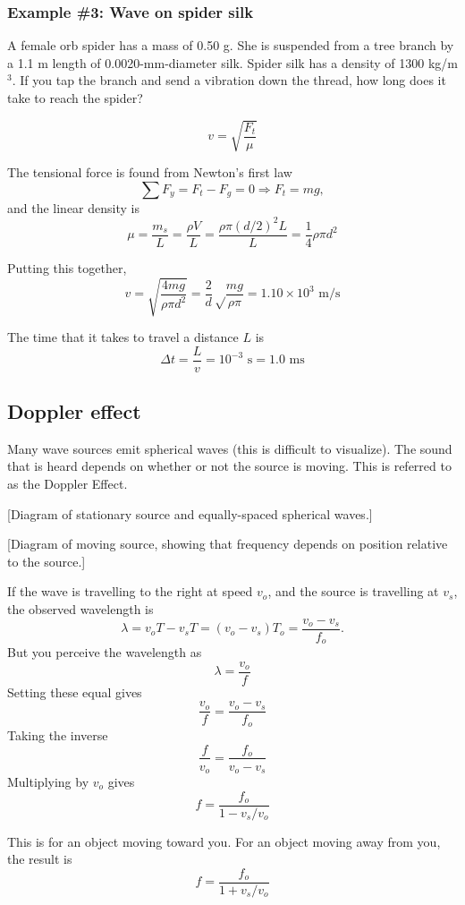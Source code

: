 \subsubsection{Example \#3: Wave on spider silk}
A female orb spider has a mass of 0.50 g. She is suspended from a tree branch by a 1.1 m length of 0.0020-mm-diameter silk. Spider silk has a density of 1300 kg/m$^3$. If you tap the branch and send a vibration down the thread, how long does it take to reach the spider?

$$v=\sqrt{\frac{F_t}{\mu}}$$

The tensional force is found from Newton's first law
$$\sum F_y = F_t-F_g = 0 \Rightarrow F_t = mg,$$
and the linear density is
$$\mu = \frac{m_s}{L} = \frac{\rho V}{L} = \frac{\rho\pi (d/2)^2L}{L}=\frac{1}{4}\rho\pi d^2$$

Putting this together,
$$v=\sqrt{\frac{4mg}{\rho \pi d^2}} = \frac{2}{d}\sqrt\frac{mg}{\rho \pi}=1.10\times 10^3\mbox{ m/s}$$

The time that it takes to travel a distance $L$ is
$$\Delta t = \frac{L}{v} = 10^{-3}\mbox{ s} = 1.0\mbox{ ms}$$
  
\subsection{Doppler effect}
Many wave sources emit spherical waves (this is difficult to visualize). The sound that is heard depends on whether or not the source is moving. This is referred to as the Doppler Effect.

[Diagram of stationary source and equally-spaced spherical waves.]\nopagebreak
\vspace{5cm}

[Diagram of moving source, showing that frequency depends on position relative to the source.]\nopagebreak
\vspace{5cm}

If the wave is travelling to the right at speed $v_o$, and the source is travelling at $v_s$, the observed wavelength is 
$$\lambda=v_oT-v_sT=(v_o-v_s)T_o=\frac{v_o-v_s}{f_o}.$$
But you perceive the wavelength as 
$$\lambda=\frac{v_o}{f}$$
Setting these equal gives
$$\frac{v_o}{f}=\frac{v_o-v_s}{f_o}$$
Taking the inverse
$$\frac{f}{v_o}=\frac{f_o}{v_o-v_s}$$
Multiplying by $v_o$ gives
$$\boxed{f=\frac{f_o}{1-v_s/v_o}}$$

This is for an object moving toward you. For an object moving away from you, the result is
$$\boxed{f=\frac{f_o}{1+v_s/v_o}}$$


